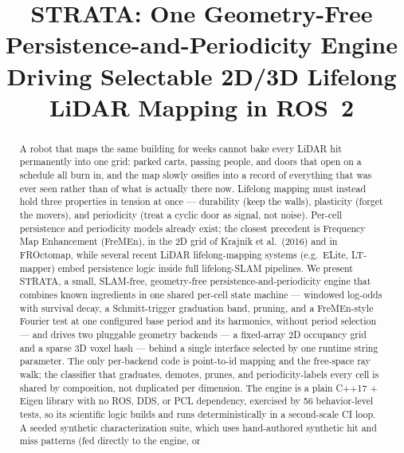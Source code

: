 \documentclass[conference]{IEEEtran}
\begin{document}
\title{STRATA: One Geometry-Free Persistence-and-Periodicity Engine\\
Driving Selectable 2D/3D Lifelong LiDAR Mapping in ROS~2}

\author{
}

\maketitle

\begin{abstract}
A robot that maps the same building for weeks cannot bake every LiDAR hit
permanently into one grid: parked carts, passing people, and doors that open on
a schedule all burn in, and the map slowly ossifies into a record of everything
that was ever seen rather than of what is actually there now. Lifelong mapping
must instead hold three properties in tension at once --- durability (keep the
walls), plasticity (forget the movers), and periodicity (treat a cyclic door as
signal, not noise). Per-cell persistence and periodicity models already exist;
the closest precedent is Frequency Map Enhancement (FreMEn), in the 2D grid of
Krajn\'ik et al.\ (2016) and in FROctomap, while several recent LiDAR
lifelong-mapping systems (e.g.\ ELite, LT-mapper) embed persistence logic
inside full lifelong-SLAM pipelines. We present STRATA, a small, SLAM-free,
geometry-free persistence-and-periodicity engine that combines known
ingredients in one shared per-cell state machine --- windowed log-odds with
survival decay, a Schmitt-trigger graduation band, pruning, and a FreMEn-style
Fourier test at one configured base period and its harmonics, without period
selection --- and drives two pluggable geometry backends --- a fixed-array 2D
occupancy grid and a sparse 3D voxel hash --- behind a single
interface selected by one runtime string parameter. The only per-backend code
is point-to-id mapping and the free-space ray walk; the classifier that
graduates, demotes, prunes, and periodicity-labels every cell is shared by
composition, not duplicated per dimension. The engine is a plain C++17 + Eigen
library with no ROS, DDS, or PCL dependency, exercised by 56 behavior-level
tests, so its scientific logic builds and runs deterministically in a
second-scale CI loop. A seeded synthetic characterization suite, which uses
hand-authored synthetic hit and miss patterns (fed directly to the engine, or

\end{abstract}
\end{document}
